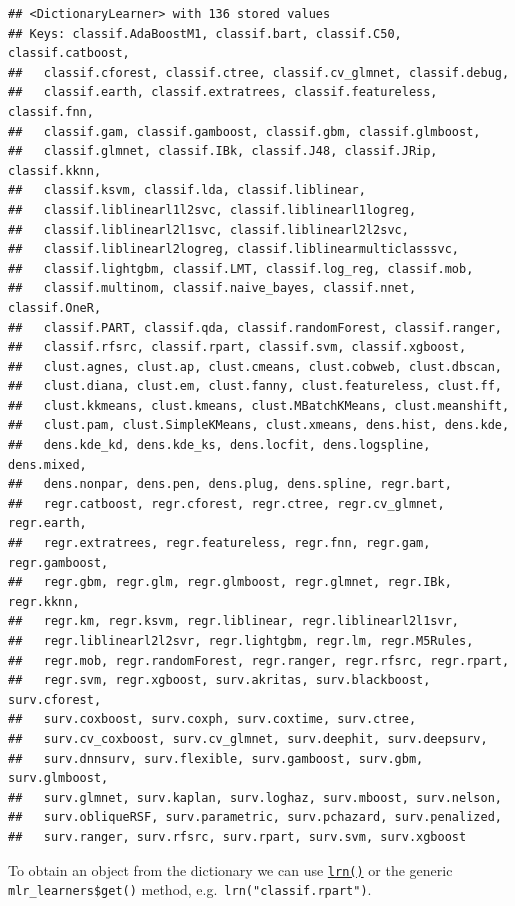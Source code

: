 \documentclass[
]{scrbook}
\begin{document}
\begin{verbatim}
## <DictionaryLearner> with 136 stored values
## Keys: classif.AdaBoostM1, classif.bart, classif.C50, classif.catboost,
##   classif.cforest, classif.ctree, classif.cv_glmnet, classif.debug,
##   classif.earth, classif.extratrees, classif.featureless, classif.fnn,
##   classif.gam, classif.gamboost, classif.gbm, classif.glmboost,
##   classif.glmnet, classif.IBk, classif.J48, classif.JRip, classif.kknn,
##   classif.ksvm, classif.lda, classif.liblinear,
##   classif.liblinearl1l2svc, classif.liblinearl1logreg,
##   classif.liblinearl2l1svc, classif.liblinearl2l2svc,
##   classif.liblinearl2logreg, classif.liblinearmulticlasssvc,
##   classif.lightgbm, classif.LMT, classif.log_reg, classif.mob,
##   classif.multinom, classif.naive_bayes, classif.nnet, classif.OneR,
##   classif.PART, classif.qda, classif.randomForest, classif.ranger,
##   classif.rfsrc, classif.rpart, classif.svm, classif.xgboost,
##   clust.agnes, clust.ap, clust.cmeans, clust.cobweb, clust.dbscan,
##   clust.diana, clust.em, clust.fanny, clust.featureless, clust.ff,
##   clust.kkmeans, clust.kmeans, clust.MBatchKMeans, clust.meanshift,
##   clust.pam, clust.SimpleKMeans, clust.xmeans, dens.hist, dens.kde,
##   dens.kde_kd, dens.kde_ks, dens.locfit, dens.logspline, dens.mixed,
##   dens.nonpar, dens.pen, dens.plug, dens.spline, regr.bart,
##   regr.catboost, regr.cforest, regr.ctree, regr.cv_glmnet, regr.earth,
##   regr.extratrees, regr.featureless, regr.fnn, regr.gam, regr.gamboost,
##   regr.gbm, regr.glm, regr.glmboost, regr.glmnet, regr.IBk, regr.kknn,
##   regr.km, regr.ksvm, regr.liblinear, regr.liblinearl2l1svr,
##   regr.liblinearl2l2svr, regr.lightgbm, regr.lm, regr.M5Rules,
##   regr.mob, regr.randomForest, regr.ranger, regr.rfsrc, regr.rpart,
##   regr.svm, regr.xgboost, surv.akritas, surv.blackboost, surv.cforest,
##   surv.coxboost, surv.coxph, surv.coxtime, surv.ctree,
##   surv.cv_coxboost, surv.cv_glmnet, surv.deephit, surv.deepsurv,
##   surv.dnnsurv, surv.flexible, surv.gamboost, surv.gbm, surv.glmboost,
##   surv.glmnet, surv.kaplan, surv.loghaz, surv.mboost, surv.nelson,
##   surv.obliqueRSF, surv.parametric, surv.pchazard, surv.penalized,
##   surv.ranger, surv.rfsrc, surv.rpart, surv.svm, surv.xgboost
\end{verbatim}

To obtain an object from the dictionary we can use \href{https://mlr3.mlr-org.com/reference/mlr_sugar.html}{\texttt{lrn()}} or the generic \texttt{mlr\_learners\$get()} method, e.g.~\texttt{lrn("classif.rpart")}.
\end{document}
